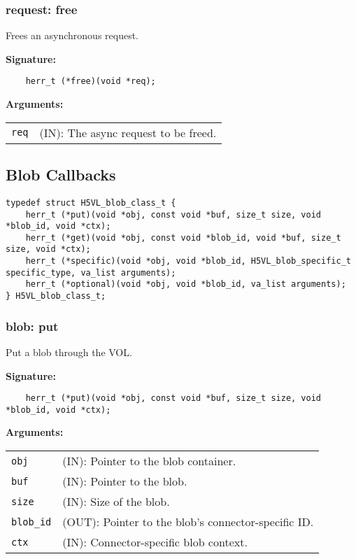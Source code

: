 \subsubsection{request: free}
Frees an asynchronous request.

\begin{mdframed}[style=bgbox]
\textbf{Signature:}
\begin{lstlisting}
    herr_t (*free)(void *req);                                                   
\end{lstlisting}

\textbf{Arguments:}\\
\begin{tabular}{l p{13.5cm}}
  \texttt{req} & (IN): The async request to be freed.\\
\end{tabular}
\end{mdframed}



\subsection{Blob Callbacks}
\begin{lstlisting}[caption={Structure for blob callback routines, H5VLconnector.h}, captionpos=b, label={lst:Blobclass}]
typedef struct H5VL_blob_class_t {                                               
    herr_t (*put)(void *obj, const void *buf, size_t size, void *blob_id, void *ctx);
    herr_t (*get)(void *obj, const void *blob_id, void *buf, size_t size, void *ctx);
    herr_t (*specific)(void *obj, void *blob_id, H5VL_blob_specific_t specific_type, va_list arguments);
    herr_t (*optional)(void *obj, void *blob_id, va_list arguments);             
} H5VL_blob_class_t; 
\end{lstlisting}

\subsubsection{blob: put}
Put a blob through the VOL.

\begin{mdframed}[style=bgbox]
\textbf{Signature:}
\begin{lstlisting}
    herr_t (*put)(void *obj, const void *buf, size_t size, void *blob_id, void *ctx);
\end{lstlisting}

\textbf{Arguments:}\\
\begin{tabular}{l p{13.5cm}}
  \texttt{obj} & (IN): Pointer to the blob container.\\
  \texttt{buf} & (IN): Pointer to the blob.\\
  \texttt{size} & (IN): Size of the blob.\\
  \texttt{blob\_id} & (OUT): Pointer to the blob's connector-specific ID.\\
  \texttt{ctx} & (IN): Connector-specific blob context.\\
\end{tabular}
\end{mdframed}

